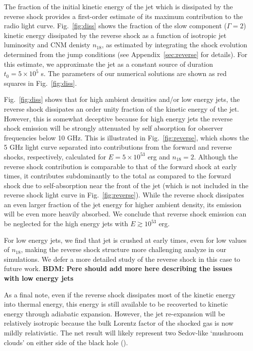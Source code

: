 \documentclass[usenatbib,fleqn]{mnras}
\begin{document}
The fraction of the initial kinetic energy of the jet which is
dissipated by the reverse shock provides a first-order estimate of its
maximum contribution to the radio light curve.  Fig.~\ref{fig:diss}
shows the fraction of the slow component ($\Gamma=2$) kinetic energy
dissipated by the reverse shock as a function of isotropic jet
luminosity and CNM denisty $n_{18}$, as estimated by integrating the
shock evolution determined from the jump conditions (see
Appendix~\ref{sec:reverse} for details).  For this estimate, we
approximate the jet as a constant source of duration $t_0 = 5 \times
10^{5}$ s.  The parameters of our numerical solutions are shown as red
squares in Fig.~\ref{fig:diss}.

Fig.~\ref{fig:diss} shows that for high ambient densities and/or low
energy jets, the reverse shock dissipates an order unity fraction of
the kinetic energy of the jet.  However, this is somewhat deceptive
because for high energy jets the reverse shock emission will be
strongly attenuated by self absorption for observer frequencies below
10 GHz.  This is illustrated in Fig.~\ref{fig:reverse}, which shows
the 5 GHz light curve separated into contributions from the forward
and reverse shocks, respectively, calculated for $E = 5\times 10^{53}$
erg and $n_{18} = 2$.  Although the reverse shock contribution is
comparable to that of the forward shock at early times, it contributes
subdominantly to the total as compared to the forward shock due to
self-absorption near the front of the jet (which is not included in
the reverse shock light curve in Fig.~\ref{fig:reverse}).  While the
reverse shock dissipates an even larger fraction of the jet energy for
higher ambient density, its emission will be even more heavily
absorbed.  We conclude that reverse shock emission can be neglected
for the high energy jets with $E\gtrsim 10^{53}$ erg.

For low energy jets, we find that jet is crushed at early times, even
for low values of $n_{18}$, making the reverse shock structure more
challenging analyze in our simulations.  We defer a more detailed
study of the reverse shock in this case to future work.  {\bf BDM:
  Pere should add more here describing the issues with low energy
  jets}

As a final note, even if the reverse shock dissipates most of the
kinetic energy into thermal energy, this energy is still available to
be recoverted to kinetic energy through adiabatic expansion.  However,
the jet re-expansion will be relatively isotropic because the bulk
Lorentz factor of the shocked gas is now mildly relativistic.  The net
result will likely represent two Sedov-like `mushroom clouds' on
either side of the black hole (\citealt{Giannios&Metzger2011}).
\end{document}
